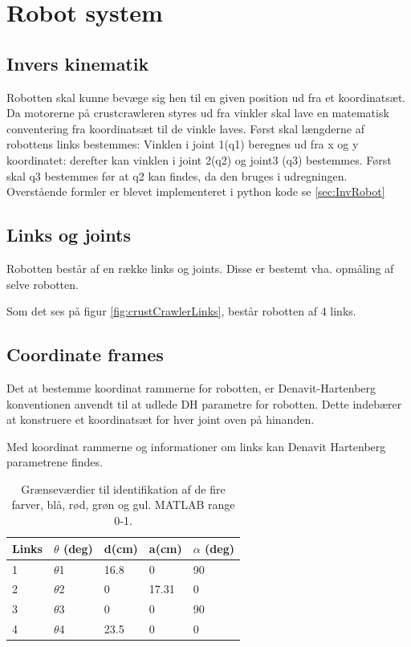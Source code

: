 \section{Robot system}
\subsection{Invers kinematik}
Robotten skal kunne bevæge sig hen til en given position ud fra et koordinatsæt. Da motorerne på crustcrawleren styres ud fra vinkler skal lave
en matematisk conventering fra koordinatsæt til de vinkle laves.\newline
Først skal længderne af robottens links bestemmes:
Vinklen i joint 1(q1) beregnes ud fra x og y koordinatet:
derefter kan vinklen i joint 2(q2) og joint3 (q3) bestemmes. Først skal q3 bestemmes før at q2 kan findes, da den bruges i udregningen.
Overstående formler er blevet implementeret i python kode se \vref{sec:InvRobot}

\subsection{Links og joints}
Robotten består af en række links og joints. Disse er bestemt vha. opmåling af selve robotten. 


Som det ses på figur \ref{fig:crustCrawlerLinks}, består robotten af 4 links. 

\subsection{Coordinate frames}
Det at bestemme koordinat rammerne for robotten, er Denavit-Hartenberg konventionen anvendt til at udlede DH parametre for robotten. Dette indebærer at konstruere et koordinatsæt for hver joint oven på hinanden. 


Med koordinat rammerne og informationer om links kan Denavit Hartenberg parametrene findes. 

\begin{table}[H]
\centering
\begin{tabular}{l|l|l|l|l}
Links	&	$\theta$ (deg) 	&	d(cm)		&	a(cm)		& 	$\alpha$ (deg)\\
\hline
1		&	$\theta$1			&	16.8			&	0			&	90\\
2		&	$\theta$2			&	0			&	17.31		&	0\\
3		&	$\theta$3			&	0			&	0			&	90\\
4		&	$\theta$4			&	23.5			&	0			&	0\\
\end{tabular}	
\caption{Grænseværdier til identifikation af de fire farver, blå, rød, grøn og gul. MATLAB range 0-1.}
\end{table}





